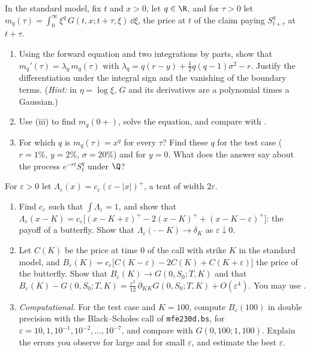 \begin{exercise}\label{ex:sm-forward-moments}
\medium In the standard model, fix $t$ and $x>0$, let $q\in\R$, and for $\tau>0$ let
$m_q(\tau)=\int_0^\infty\xi^q\,G(t,x;t+\tau,\xi)\,\dd\xi$, the price at $t$ of the claim paying
$S_{t+\tau}^q$ at $t+\tau$.
\begin{enumerate}[label=(\alph*)]
  \item Using the forward equation  and two integrations by parts, show that
    $m_q'(\tau)=\lambda_q\,m_q(\tau)$ with $\lambda_q=q(r-y)+\frac12q(q-1)\sigma^2-r$. Justify the
    differentiation under the integral sign and the vanishing of the boundary terms. (\emph{Hint:}
    in $\eta=\log\xi$, $G$ and its derivatives are a polynomial times a Gaussian.)
  \item Use (iii) to find $m_q(0+)$, solve the equation, and compare with
    .
  \item For which $q$ is $m_q(\tau)=x^q$ for every $\tau$? Find these $q$ for the test case
    ($r=1\%$, $y=2\%$, $\sigma=20\%$) and for $y=0$. What does the answer say about the process
    $e^{-rt}S_t^q$ under $\Q$?
\end{enumerate}
\end{exercise}

\begin{exercise}\label{ex:sm-butterfly}
\medium For $\varepsilon>0$ let $\Lambda_\varepsilon(x)=c_\varepsilon(\varepsilon-|x|)^+$, a tent of width
$2\varepsilon$.
\begin{enumerate}[label=(\alph*)]
  \item Find $c_\varepsilon$ such that $\int\Lambda_\varepsilon=1$, and show that
    $\Lambda_\varepsilon(x-K)=c_\varepsilon\big[(x-K+\varepsilon)^+-2(x-K)^++(x-K-\varepsilon)^+\big]$: the
    payoff of a butterfly. Show that $\Lambda_\varepsilon(\cdot-K)\to\delta_K$ as $\varepsilon\downarrow0$.
  \item Let $C(K)$ be the price at time $0$ of the call with strike $K$ in the standard model, and
    $B_\varepsilon(K)=c_\varepsilon\big[C(K-\varepsilon)-2C(K)+C(K+\varepsilon)\big]$ the price of the
    butterfly. Show that $B_\varepsilon(K)\to G(0,S_0;T,K)$ and that
    $B_\varepsilon(K)-G(0,S_0;T,K)=\frac{\varepsilon^2}{12}\,\partial_{KK}G(0,S_0;T,K)+O(\varepsilon^4)$.
    You may use .
  \item \emph{Computational.} For the test case and $K=100$, compute $B_\varepsilon(100)$ in double
    precision with the Black--Scholes call of \texttt{mfe230d.bs}, for
    $\varepsilon=10,1,10^{-1},10^{-2},\dots,10^{-7}$, and compare with $G(0,100;1,100)$. Explain the
    errors you observe for large and for small $\varepsilon$, and estimate the best $\varepsilon$.
\end{enumerate}
\end{exercise}

